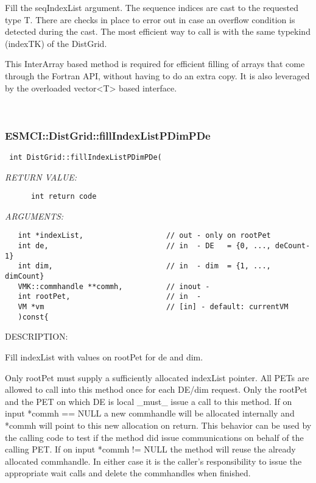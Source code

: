       Fill the seqIndexList argument. The sequence indices are cast to the
      requested type T. There are checks in place to error out in case an
      overflow condition is detected during the cast. The most efficient way
      to call is with the same typekind (indexTK) of the DistGrid.
      
      This InterArray based method is required for efficient filling of arrays
      that come through the Fortran API, without having to do an extra copy. 
      It is also leveraged by the overloaded vector<T> based interface.
   
 
\mbox{}\hrulefill\
 
\subsubsection [ESMCI::DistGrid::fillIndexListPDimPDe] {ESMCI::DistGrid::fillIndexListPDimPDe}


  
\begin{verbatim} int DistGrid::fillIndexListPDimPDe(\end{verbatim}{\em RETURN VALUE:}
\begin{verbatim}      int return code\end{verbatim}{\em ARGUMENTS:}
\begin{verbatim}   int *indexList,                   // out - only on rootPet
   int de,                           // in  - DE   = {0, ..., deCount-1}
   int dim,                          // in  - dim  = {1, ..., dimCount}
   VMK::commhandle **commh,          // inout -
   int rootPet,                      // in  -
   VM *vm                            // [in] - default: currentVM
   )const{\end{verbatim}
{\sf DESCRIPTION:\\ }


      Fill indexList with values on rootPet for de and dim.
  
      Only rootPet must supply a sufficiently allocated indexList pointer.
      All PETs are allowed to call into this method once for each DE/dim
      request. Only the rootPet and the PET on which DE is local _must_ issue
      a call to this method. If on input *commh == NULL a new commhandle will
      be allocated internally and *commh will point to this new allocation on
      return. This behavior can be used by the calling code to test if
      the method did issue communications on behalf of the calling PET.
      If on input *commh != NULL the method will reuse the already
      allocated commhandle. In either case it is the caller's responsibility to
      issue the appropriate wait calls and delete the commhandles when finished.
   
